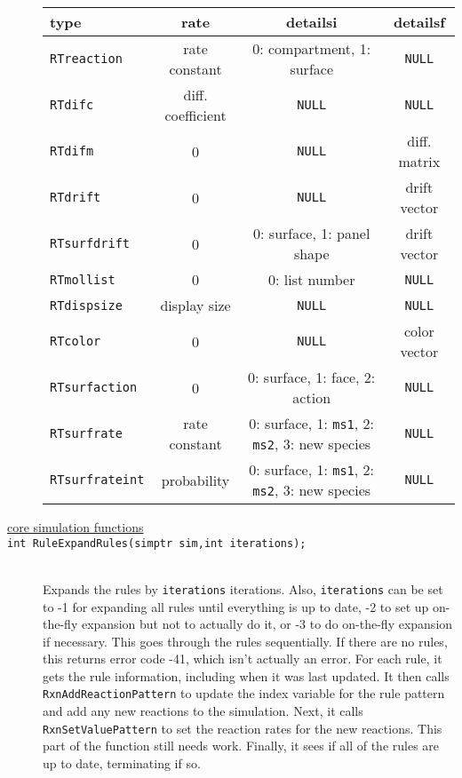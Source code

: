 \documentclass {scrbook}
\newcommand {\ttt} {\texttt}
\begin{document}
\begin{description}
\begin{longtable}[c]{lccc}
type&rate&detailsi&detailsf\\
\hline
\ttt{RTreaction}&rate constant&0: compartment, 1: surface&\ttt{NULL}\\
\ttt{RTdifc}&diff. coefficient&\ttt{NULL}&\ttt{NULL}\\
\ttt{RTdifm}&0&\ttt{NULL}&diff. matrix\\
\ttt{RTdrift}&0&\ttt{NULL}&drift vector\\
\ttt{RTsurfdrift}&0&0: surface, 1: panel shape&drift vector\\
\ttt{RTmollist}&0&0: list number&\ttt{NULL}\\
\ttt{RTdispsize}&display size&\ttt{NULL}&\ttt{NULL}\\
\ttt{RTcolor}&0&\ttt{NULL}&color vector\\
\ttt{RTsurfaction}&0&0: surface, 1: face, 2: action&\ttt{NULL}\\
\ttt{RTsurfrate}&rate constant&0: surface, 1: \ttt{ms1}, 2: \ttt{ms2}, 3: new species&\ttt{NULL}\\
\ttt{RTsurfrateint}&probability&0: surface, 1: \ttt{ms1}, 2: \ttt{ms2}, 3: new species&\ttt{NULL}\\

\end{longtable}


\item[\underline{core simulation functions}]

\item[\ttt{int RuleExpandRules(simptr sim,int iterations);}]
\hfill \\
Expands the rules by \ttt{iterations} iterations. Also, \ttt{iterations} can be set to -1 for expanding all rules until everything is up to date, -2 to set up on-the-fly expansion but not to actually do it, or -3 to do on-the-fly expansion if necessary. This goes through the rules sequentially. If there are no rules, this returns error code -41, which isn't actually an error. For each rule, it gets the rule information, including when it was last updated. It then calls \ttt{RxnAddReactionPattern} to update the index variable for the rule pattern and add any new reactions to the simulation. Next, it calls \ttt{RxnSetValuePattern} to set the reaction rates for the new reactions. This part of the function still needs work. Finally, it sees if all of the rules are up to date, terminating if so.


\end{description}
\end{document}
